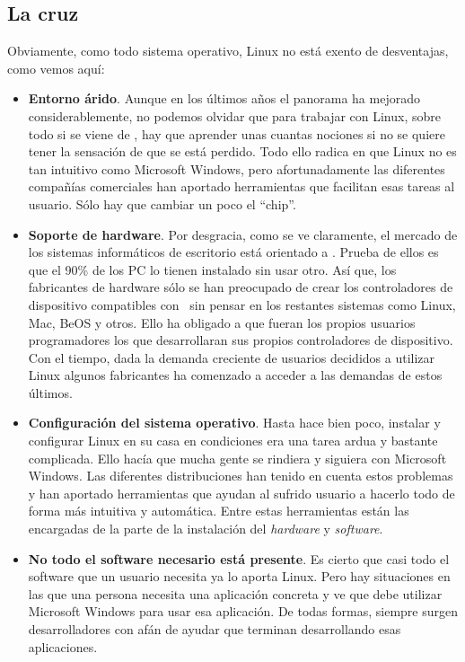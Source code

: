 \subsection{La cruz}

Obviamente,  como todo  sistema  operativo, Linux  no  está exento  de
desventajas, como vemos aquí:

\begin{itemize}

\item {\bf Entorno  árido}. Aunque en los últimos años  el panorama ha
mejorado considerablemente,  no podemos olvidar que  para trabajar con
Linux,  sobre todo  si se  viene de  \windows, hay  que aprender  unas
cuantas nociones  si no se  quiere tener la  sensación de que  se está
perdido.  Todo ello  radica  en que  Linux no  es  tan intuitivo  como
Microsoft  Windows,  pero  afortunadamente  las  diferentes  compañías
comerciales  han aportado  herramientas que  facilitan esas  tareas al
usuario. Sólo hay que cambiar un poco el ``chip''.

\item {\bf Soporte de hardware}. Por desgracia, como se ve claramente,
el mercado de los sistemas informáticos de escritorio está orientado a
\windows. Prueba de ellos es que el 90\% de los PC lo tienen instalado
sin  usar otro.  Así  que, los  fabricantes de  hardware  sólo se  han
preocupado de  crear los controladores de  dispositivo compatibles con
\windows\  sin  pensar en  los  restantes  sistemas como  Linux,  Mac,
BeOS  y otros.  Ello ha  obligado a  que fueran  los propios  usuarios
programadores  los  que  desarrollaran sus  propios  controladores  de
dispositivo.  Con el  tiempo, dada  la demanda  creciente de  usuarios
decididos a utilizar Linux algunos  fabricantes ha comenzado a acceder
a las demandas de estos últimos.

\item {\bf Configuración del sistema operativo}. Hasta hace bien poco,
instalar y  configurar Linux en su  casa en condiciones era  una tarea
ardua y bastante complicada. Ello hacía  que mucha gente se rindiera y
siguiera  con Microsoft  Windows.  Las  diferentes distribuciones  han
tenido  en cuenta  estos  problemas y  han  aportado herramientas  que
ayudan al  sufrido usuario  a hacerlo  todo de  forma más  intuitiva y
automática. Entre estas herramientas están  las encargadas de la parte
de la instalación del {\em hardware} y {\em software}.

\item {\bf No todo el software necesario está presente}. Es cierto que
casi todo el software que un usuario necesita ya lo aporta Linux. Pero
hay  situaciones  en  las  que una  persona  necesita  una  aplicación
concreta  y ve  que  debe  utilizar Microsoft  Windows  para usar  esa
aplicación. De  todas formas, siempre surgen  desarrolladores con afán
de ayudar que terminan desarrollando esas aplicaciones.


\end{itemize}
